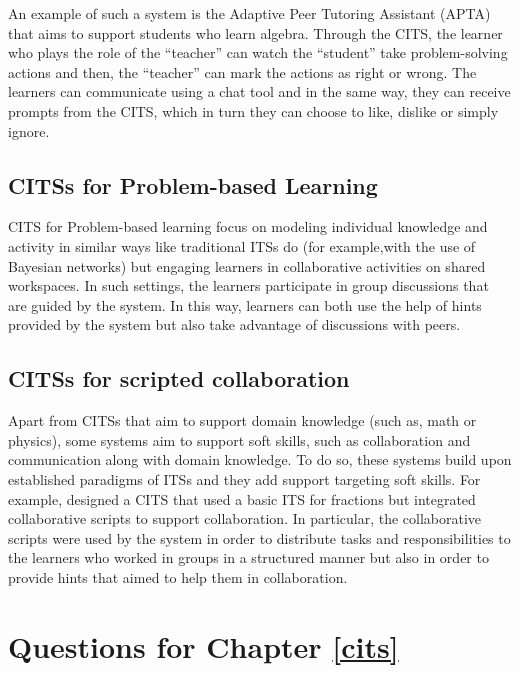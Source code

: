 \documentclass[
]{book}
\begin{document}
An example of such a system is the Adaptive Peer Tutoring Assistant (APTA) \citep{walker2014adaptive} that aims to support students who learn algebra. Through the CITS, the learner who plays the role of the ``teacher'' can watch the ``student'' take problem-solving actions and then, the ``teacher'' can mark the actions as right or wrong. The learners can communicate using a chat tool and in the same way, they can receive prompts from the CITS, which in turn they can choose to like, dislike or simply ignore.

\subsection{CITSs for Problem-based Learning}\label{citss-for-problem-based-learning}

CITS for Problem-based learning focus on modeling individual knowledge and activity in similar ways like traditional ITSs do (for example,with the use of Bayesian networks) but engaging learners in collaborative activities on shared workspaces.
In such settings, the learners participate in group discussions that are guided by the system. In this way, learners can both use the help of hints provided by the system but also take advantage of discussions with peers.

\subsection{CITSs for scripted collaboration}\label{citss-for-scripted-collaboration}

Apart from CITSs that aim to support domain knowledge (such as, math or physics), some systems aim to support soft skills, such as collaboration and communication along with domain knowledge. To do so, these systems build upon established paradigms of ITSs and they add support targeting soft skills.
For example, \citep{olsen2016investigating} designed a CITS that used a basic ITS for fractions but integrated collaborative scripts to support collaboration. In particular, the collaborative scripts were used by the system in order to distribute tasks and responsibilities to the learners who worked in groups in a structured manner but also in order to provide hints that aimed to help them in collaboration.

\section{Questions for Chapter \ref{cits}}\label{questions-for-chapter-refcits}
\end{document}
